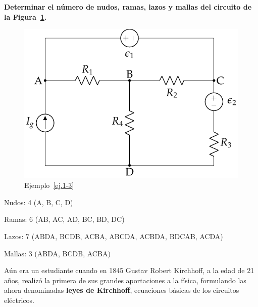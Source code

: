 	\begin{example}\label{ej.1-3}
          \textbf{Determinar el número de nudos, ramas, lazos y mallas
            del circuito de la Figura~\ref{fig:mallas}.}
          \begin{figure}[H]
            \centering
            \includegraphics[width=0.5\linewidth]{../figs/mallas.pdf}
            \caption{Ejemplo~\ref{ej.1-3}}
            \label{fig:mallas}
          \end{figure}
		
          Nudos: 4 (A, B, C, D)
		
          Ramas: 6 (AB, AC, AD, BC, BD, DC)
		
          Lazos: 7 (ABDA, BCDB, ACBA, ABCDA, ACBDA, BDCAB, ACDA)
		
          Mallas: 3 (ABDA, BCDB, ACBA)
	\end{example}
	
	
	Aún era un estudiante cuando en 1845 Gustav Robert Kirchhoff,
        a la edad de 21 años, realizó la primera de sus grandes
        aportaciones a la física, formulando las ahora denominadas
        \textbf{leyes de Kirchhoff}, ecuaciones básicas de los
        circuitos eléctricos.
	
